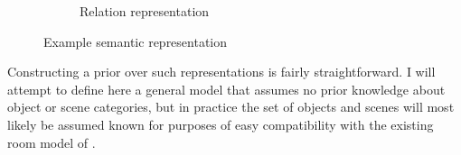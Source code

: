 \documentclass[12pt]{article}
\begin{document}
\begin{figure}[t]
\begin{subfigure}{0.8\textwidth}
\caption{Relation representation}
\end{subfigure}

\caption{Example semantic representation \label{fig:semantic-representation}}
\end{figure}

Constructing a prior over such representations is fairly straightforward.  I will attempt to define here a general model that assumes no prior knowledge about object or scene categories, but in practice the set of objects and scenes will most likely be assumed known for purposes of easy compatibility with the existing room model of \cite{delpero2012bayesian}.
\end{document}

